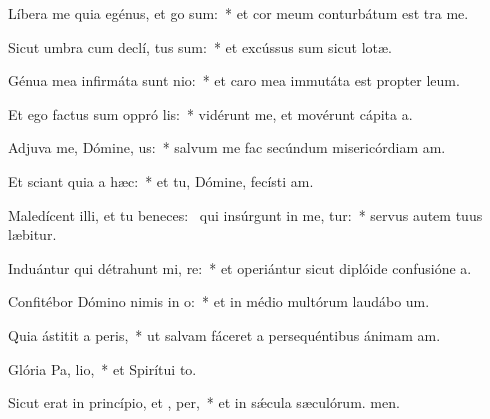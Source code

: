 \item Líbera me quia egénus, et  go sum:~* et cor meum conturbátum est tra me.
\item Sicut umbra cum declí, tus sum:~* et excússus sum sicut lotæ.
\item Génua mea infirmáta sunt  nio:~* et caro mea immutáta est propter leum.
\item Et ego factus sum oppró lis:~* vidérunt me, et movérunt cápita a.
\item Adjuva me, Dómine,  us:~* salvum me fac secúndum misericórdiam am.
\item Et sciant quia  a hæc:~* et tu, Dómine, fecísti am.
\item Maledícent illi, et tu beneces:~\pscross{} qui insúrgunt in me, tur:~* servus autem tuus læbitur.
\item Induántur qui détrahunt mi, re:~* et operiántur sicut diplóide confusióne a.
\item Confitébor Dómino nimis in  o:~* et in médio multórum laudábo um.
\item Quia ástitit a  peris,~* ut salvam fáceret a persequéntibus ánimam am.
\item Glória Pa,  lio,~* et Spirítui to.
\item Sicut erat in princípio, et ,  per,~* et in sǽcula sæculórum. men.
